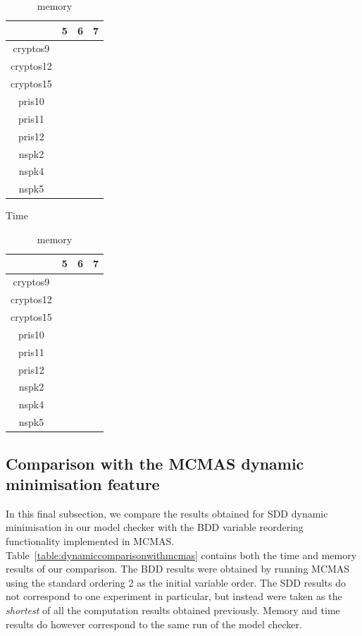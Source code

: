 \documentclass[11pt]{report}
\begin{document}
\begin{table}
\centering
\begin{tabular}{|*{4}{c|}}
\hline
 &5 & 6 & 7 \\ \hline
cryptos9 && &\\ \hline
cryptos12  &&  & \\ \hline
cryptos15   &&  & \\ \hline
pris10 &  && \\ \hline
pris11 & & & \\ \hline
pris12 & && \\ \hline
nspk2 & & & \\ \hline
nspk4 & && \\ \hline
nspk5 &&& \\ \hline
\end{tabular}
\caption{Time}
\label{table:newdaotime}
\vspace{1in}
\centering
\begin{tabular}{|*{4}{c|}}
\hline
& 5 & 6 & 7\\ \hline
cryptos9 & & & \\ \hline
cryptos12  &  && \\ \hline
cryptos15   &  && \\ \hline
pris10 &&  & \\ \hline
pris11 & & & \\ \hline
pris12 & && \\ \hline
nspk2 &  && \\ \hline
nspk4 & && \\ \hline
nspk5 &  && \\ \hline
\end{tabular}
\caption{memory}
\label{table:newdaomemory}
\end{table}

\subsection{Comparison with the MCMAS dynamic minimisation feature} 
\label{daocomparison}

In this final subsection, we compare the results obtained for SDD dynamic minimisation in our model checker with the BDD variable reordering functionality implemented in MCMAS. Table~\ref{table:dynamiccomparisonwithmcmas} contains both the time and memory results of our comparison. The BDD results were obtained by running MCMAS using the standard ordering 2 as the initial variable order. The SDD results do not correspond to one experiment in particular, but instead were taken as the \textit{shortest} of all the computation results obtained previously. Memory and time results do however correspond to the same run of the model checker.
\end{document}
